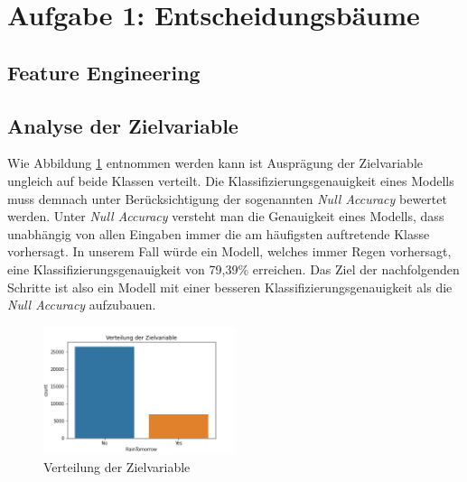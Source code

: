 \section{Aufgabe 1: Entscheidungsbäume}
\subsection{Feature Engineering}

\subsection{Analyse der Zielvariable}
Wie Abbildung \ref{fig:disc_target_variable} entnommen werden kann ist Ausprägung der Zielvariable ungleich auf beide Klassen verteilt. Die Klassifizierungsgenauigkeit eines Modells muss demnach unter Berücksichtigung der sogenannten \emph{Null Accuracy} bewertet werden. Unter \emph{Null Accuracy} versteht man die Genauigkeit eines Modells, dass unabhängig von allen Eingaben immer die am häufigsten auftretende Klasse vorhersagt. In unserem Fall würde ein Modell, welches immer Regen vorhersagt, eine Klassifizierungsgenauigkeit von 79,39\% erreichen. Das Ziel der nachfolgenden Schritte ist also ein Modell mit einer besseren Klassifizierungsgenauigkeit als die \emph{Null Accuracy} aufzubauen.

\begin{figure}[h]
	\centering
	\includegraphics[width = 0.5\textwidth]{Bilder/distribution_target_variable}
	\caption{Verteilung der Zielvariable}
	\label{fig:disc_target_variable}
\end{figure}

